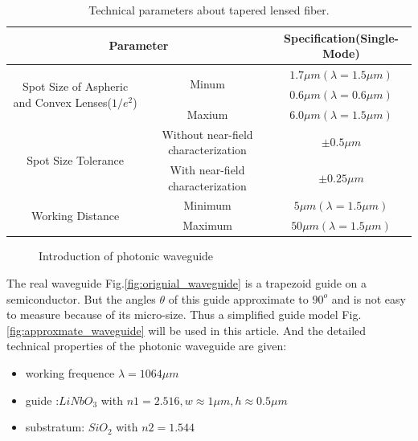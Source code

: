 \begin{table}
\begin{tabular}{c|c|c}
\hline
\multicolumn{2}{c|}{\textbf{Parameter}}&\textbf{Specification(Single-Mode)}\\
\hline
\multirow{3}{*}{\parbox[t]{0.25\textwidth}{Spot Size of Aspheric and Convex Lenses($1/e^2$)}}&\multirow{2}{*}{Minum}&$1.7\mu m(\lambda=1.5\mu m)$\\
&																		 &$0.6\mu m(\lambda=0.6\mu m)$\\
&Maxium															 &$6.0\mu m(\lambda=1.5\mu m)$\\
\hline
\multirow{2}{*}{Spot Size Tolerance}&Without near-field characterization &$\pm 0.5\mu m$\\
&With near-field characterization &$\pm 0.25\mu m$\\
\hline
\multirow{2}{*}{Working Distance} &Minimum &$5\mu m(\lambda=1.5\mu m)$\\
&																	Maximum &$50\mu m(\lambda=1.5\mu m)$\\
\hline
\end {tabular}
\caption{Technical parameters about tapered lensed fiber.\cite{nanoscal_tapered_fiber}}
\label{tab:technical parameters_lensed_fiber}
\end{table}



\begin{figure}
\centering
{}
\hfill
{}
\caption{Introduction of  photonic waveguide}
\label{fig:photonic_waveguide}
\end{figure}

The real waveguide Fig.\ref{fig:orignial_waveguide} is a trapezoid guide on a semiconductor. But the angles $\theta$ of this guide approximate to $90^{o}$ and is not easy to measure because of its micro-size. Thus a simplified guide model Fig.\ref{fig:approxmate_waveguide} will be used in this article. And the detailed technical properties of the photonic waveguide are given:
\begin{itemize}
\item working frequence $\lambda=1064 \mu m$
\item guide :$LiNbO_{3}$ with $ n1=2.516, w\approx 1\mu m, h\approx 0.5 \mu m$
\item substratum: $SiO_{2}$ with $n2=1.544 $
\end{itemize}
